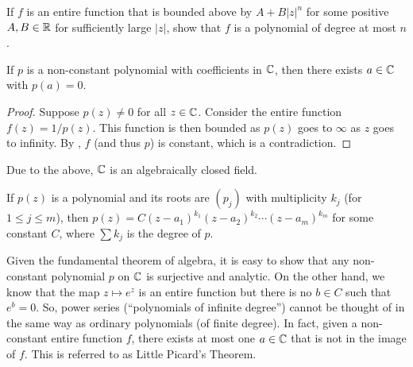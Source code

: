 	\begin{exercise}
		If $f$ is an entire function that is bounded above by $A + B |z|^n$ for some positive $A,B \in \mathbb{R}$ for sufficiently large $|z|$, show that $f$ is a polynomial of degree at most $n$.
	\end{exercise}

	\begin{ftheo}
		If $p$ is a non-constant polynomial with coefficients in $\mathbb{C}$, then there exists $a \in \mathbb{C}$ with $p(a) = 0$.
	\end{ftheo}
	\begin{proof}
		Suppose $p(z) \ne 0$ for all $z \in \mathbb{C}$. Consider the entire function $f(z) = 1/p(z)$. This function is then bounded as $p(z)$ goes to $\infty$ as $z$ goes to infinity. By , $f$ (and thus $p$) is constant, which is a contradiction.
	\end{proof}

	Due to the above, $\mathbb{C}$ is an algebraically closed field.

	\begin{corollary}
		If $p(z)$ is a polynomial and its roots are $(p_j)$ with multiplicity $k_j$ (for $1\le j\le m$), then $p(z) = C (z-a_1)^{k_1} (z-a_2)^{k_2} \cdots (z-a_m)^{k_m}$ for some constant $C$, where $\sum k_j$ is the degree of $p$.
	\end{corollary}

	Given the fundamental theorem of algebra, it is easy to show that any non-constant polynomial $p$ on $\mathbb{C}$ is surjective and analytic. On the other hand, we know that the map  $z \mapsto e^z$ is an entire function but there is no $b \in C$ such that $e^b = 0$. So, power series (``polynomials of infinite degree'') cannot be thought of in the same way as ordinary polynomials (of finite degree). In fact, given a non-constant entire function $f$, there exists at most one $a \in \mathbb{C}$ that is not in the image of $f$. This is referred to as Little Picard's Theorem.


